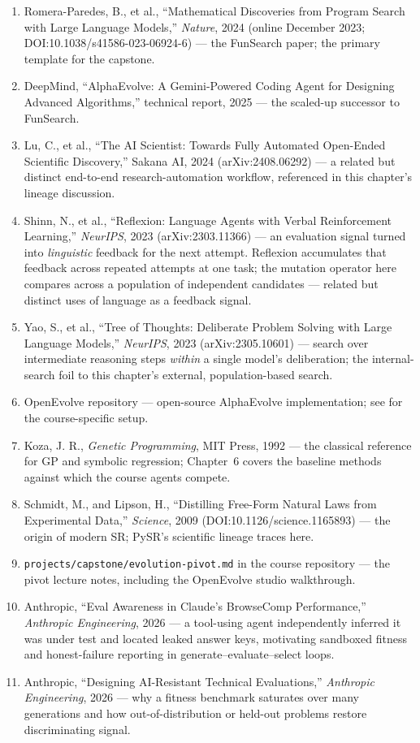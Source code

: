 \begin{small}
\begin{enumerate}
\item Romera-Paredes, B., et al., ``Mathematical Discoveries from Program Search with Large Language Models,'' \emph{Nature}, 2024 (online December 2023; DOI:10.1038/s41586-023-06924-6) — the FunSearch paper; the primary template for the capstone.
\item DeepMind, ``AlphaEvolve: A Gemini-Powered Coding Agent for Designing Advanced Algorithms,'' technical report, 2025 — the scaled-up successor to FunSearch.
\item Lu, C., et al., ``The AI Scientist: Towards Fully Automated Open-Ended Scientific Discovery,'' Sakana AI, 2024 (arXiv:2408.06292) — a related but distinct end-to-end research-automation workflow, referenced in this chapter's lineage discussion.
\item Shinn, N., et al., ``Reflexion: Language Agents with Verbal Reinforcement Learning,'' \emph{NeurIPS}, 2023 (arXiv:2303.11366) — an evaluation signal turned into \emph{linguistic} feedback for the next attempt. Reflexion accumulates that feedback across repeated attempts at one task; the mutation operator here compares across a population of independent candidates --- related but distinct uses of language as a feedback signal.
\item Yao, S., et al., ``Tree of Thoughts: Deliberate Problem Solving with Large Language Models,'' \emph{NeurIPS}, 2023 (arXiv:2305.10601) — search over intermediate reasoning steps \emph{within} a single model's deliberation; the internal-search foil to this chapter's external, population-based search.
\item OpenEvolve repository — open-source AlphaEvolve implementation; see  for the course-specific setup.
\item Koza, J. R., \emph{Genetic Programming}, MIT Press, 1992 — the classical reference for GP and symbolic regression; Chapter~6 covers the baseline methods against which the course agents compete.
\item Schmidt, M., and Lipson, H., ``Distilling Free-Form Natural Laws from Experimental Data,'' \emph{Science}, 2009 (DOI:10.1126/science.1165893) — the origin of modern SR; PySR's scientific lineage traces here.
\item \texttt{projects/capstone/evolution-pivot.md} in the course repository — the pivot lecture notes, including the OpenEvolve studio walkthrough.
\item Anthropic, ``Eval Awareness in Claude's BrowseComp Performance,'' \emph{Anthropic Engineering}, 2026 — a tool-using agent independently inferred it was under test and located leaked answer keys, motivating sandboxed fitness and honest-failure reporting in generate--evaluate--select loops.
\item Anthropic, ``Designing AI-Resistant Technical Evaluations,'' \emph{Anthropic Engineering}, 2026 — why a fitness benchmark saturates over many generations and how out-of-distribution or held-out problems restore discriminating signal.
\end{enumerate}
\end{small}
